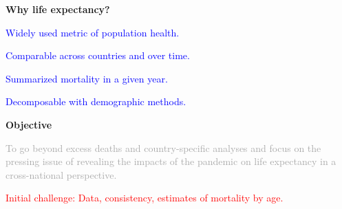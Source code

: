 \documentclass[xcolor={dvipsnames}]{beamer}
\begin{document}
\begin{frame}
	\begin{center}
		\LARGE{\textbf{Why life expectancy?}} \pause \linebreak
	
	\end{center}
		\begin{itemize}
	\Large{
	\item \textcolor{blue}{Widely used metric of population health.}
	\item \textcolor{blue}{Comparable across countries and over time.}
	\item \textcolor{blue}{Summarized mortality in a given year.}
	\item \textcolor{blue}{Decomposable with demographic methods.}
	}
	\end{itemize}
	
		
\end{frame}

\begin{frame}
	\begin{center}
		\LARGE{\textbf{Objective}} \linebreak
		
\Large{\textcolor{darkgray}{To go beyond excess deaths and country-specific analyses and focus on the pressing issue of revealing the impacts of the pandemic on life expectancy in a cross-national perspective.}} \pause \linebreak

	\end{center}
	
\Large{\textcolor{red}{Initial challenge: Data, consistency, estimates of mortality by age.}}
	
		
\end{frame}
\end{document}
